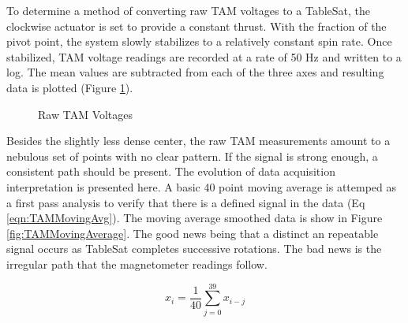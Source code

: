 To determine a method of converting raw TAM voltages to a TableSat, the clockwise actuator is set to provide a constant thrust.  With the fraction of the pivot point, the system slowly stabilizes to a relatively constant spin rate.  Once stabilized, TAM voltage readings are recorded at a rate of 50 Hz and written to a log.  The mean values are subtracted from each of the three axes and resulting data is plotted (Figure \ref{fig:TAMRaw}).

\begin{figure}[H]
\centerline{}
\caption{Raw TAM Voltages}
\label{fig:TAMRaw}
\end{figure}

Besides the slightly less dense center, the raw TAM measurements amount to a nebulous set of points with no clear pattern.  If the signal is strong enough, a consistent path should be present.  The evolution of data acquisition interpretation is presented here.  A basic 40 point moving average is attemped as a first pass analysis to verify that there is a defined signal in the data (Eq \ref{eqn:TAMMovingAvg}).  The moving average smoothed data is show in Figure \ref{fig:TAMMovingAverage}.  The good news being that a distinct an repeatable signal occurs as TableSat completes successive rotations.  The bad news is the irregular path that the magnetometer readings follow.

\begin{equation}
  x_i = \frac{1}{40} \sum^{39}_{j=0} x_{i-j}
  \label{eqn:TAMMovingAvg}
\end{equation}

